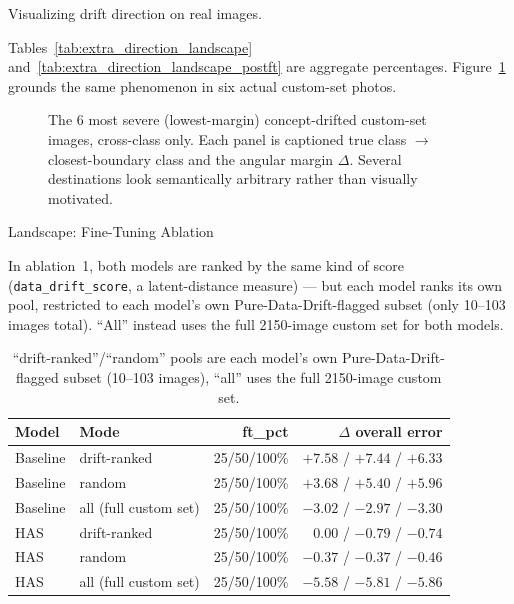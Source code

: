 Visualizing drift direction on real images.

Tables~\ref{tab:extra_direction_landscape}
and~\ref{tab:extra_direction_landscape_postft} are aggregate percentages.
Figure~\ref{fig:extra_concept_drift_examples} grounds the same phenomenon in six actual
custom-set photos.

\begin{figure}[htbp]
    \centering
    \resizebox{\textwidth}{!}{}
    \caption{The 6 most severe (lowest-margin) concept-drifted custom-set images, cross-class
    only. Each panel is captioned true class $\rightarrow$ closest-boundary class and the
    angular margin $\Delta$. Several destinations look semantically arbitrary rather than
    visually motivated.}
    \label{fig:extra_concept_drift_examples}
\end{figure}


Landscape: Fine-Tuning Ablation 
\label{sec:extra_landscape_ablation}


In ablation~1, both models are ranked by the same kind of score
(\texttt{data\_drift\_score}, a latent-distance measure) — but each model ranks its own
pool, restricted to each model's own Pure-Data-Drift-flagged subset
(only 10--103 images total). ``All'' instead uses the full 2150-image custom set for both models.

\begin{table}[htbp]
\centering
\caption{``drift-ranked''/``random'' pools are each model's own Pure-Data-Drift-flagged subset (10--103 images), ``all'' uses the full 2150-image custom set.}
\label{tab:extra_ablation1}
\begin{tabular}{@{} l l r r @{}}
\toprule
\textbf{Model} & \textbf{Mode} & \textbf{ft\_pct} & \textbf{$\Delta$ overall error} \\
\midrule
Baseline & drift-ranked & 25/50/100\% & $+7.58$ / $+7.44$ / $+6.33$ \\
Baseline & random       & 25/50/100\% & $+3.68$ / $+5.40$ / $+5.96$ \\
Baseline & all (full custom set) & 25/50/100\% & $-3.02$ / $-2.97$ / $-3.30$ \\
HAS      & drift-ranked & 25/50/100\% & $0.00$ / $-0.79$ / $-0.74$ \\
HAS      & random       & 25/50/100\% & $-0.37$ / $-0.37$ / $-0.46$ \\
HAS      & all (full custom set) & 25/50/100\% & $-5.58$ / $-5.81$ / $-5.86$ \\
\bottomrule
\end{tabular}
\end{table}

